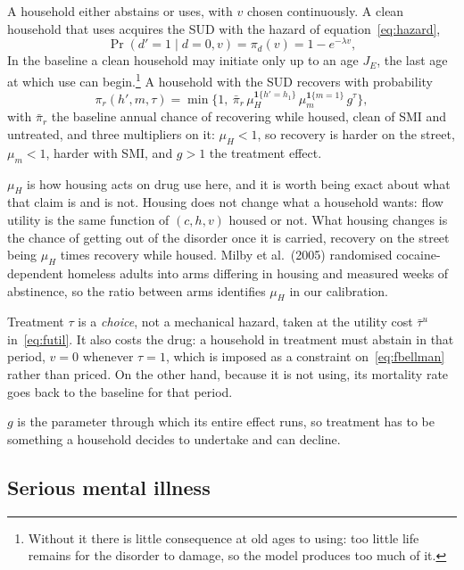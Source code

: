 \documentclass[10pt]{article}
\begin{document}
A household either abstains or uses, with $v$ chosen continuously. A clean
household that uses acquires the SUD with the hazard of
equation~\eqref{eq:hazard},
\begin{equation}\label{eq:fd}
\Pr(d'=1\mid d=0,v)=\pi_d(v)=1-e^{-\lambda v},
\end{equation}
In the baseline a clean household may initiate only up to an age
$J_E$, the last age at which use can begin.\footnote{Without it there
is little consequence at old ages to using: too little life remains for the
disorder to damage, so the model produces too much of it.} A household with the SUD recovers with probability
\begin{equation}\label{eq:frecover}
\pi_r(h',m,\tau)=\min\Big\{1,\ \bar\pi_r\,
\mu_H^{\mathbf{1}\{h'=h_1\}}\,\mu_m^{\mathbf{1}\{m=1\}}\,g^{\tau}\Big\},
\end{equation}
with $\bar\pi_r$ the baseline annual chance of recovering while housed,
clean of SMI and untreated, and three multipliers on it:
$\mu_H<1$, so recovery is harder on the street, $\mu_m<1$, harder with
SMI, and $g>1$ the treatment effect.

$\mu_H$ is how housing acts on drug use here, and it is worth being
exact about what that claim is and is not. Housing does not change what a
household wants: flow utility is the same function of $(c,h,v)$ housed or not.
What housing changes is the
chance of getting out of the disorder once it is carried, recovery on the street
being $\mu_H$ times recovery while housed.
Milby et al.\ (2005)
randomised cocaine-dependent homeless adults into arms differing in housing and
measured weeks of abstinence, so the ratio between arms identifies $\mu_H$
in our calibration.


Treatment $\tau$ is a \emph{choice}, not a mechanical hazard, taken at the
utility cost $\bar\tau^u$ in~\eqref{eq:futil}. It also costs the drug: a
household in treatment must abstain in that period, $v=0$ whenever $\tau=1$, which
is imposed as a constraint on~\eqref{eq:fbellman} rather than priced.
On the other hand, because it is not using, its mortality rate goes back
to the baseline for that period.

$g$ is the
parameter through
which its entire effect runs, so treatment has to be something a household decides
to undertake and can decline.

\subsection{Serious mental illness}\label{sec:fsmi}
\end{document}
